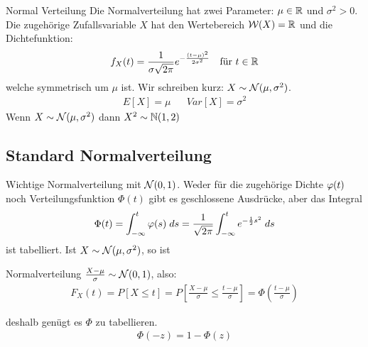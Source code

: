 \begin{definition}{Normal Verteilung}
  Die Normalverteilung hat zwei Parameter: $\mu \in \mathbb{R}$ und $\sigma^2 > 0$. Die
zugehörige Zufallsvariable $X$ hat den Wertebereich $\mathcal{W} (X) = \mathbb{R}$ und die
Dichtefunktion:
\begin{align*}
  f_X (t) = \frac{1}{\sigma \sqrt{2 \pi}} e^{- \frac{{(t - \mu)}^2}{2 \sigma^2}}
   &  & \text{für } t \in \mathbb{R}
\end{align*}
welche symmetrisch um $\mu$ ist. Wir schreiben kurz: $X \sim \mathcal{N} (\mu, \sigma^2)$.
\begin{align*}
  E[X] = \mu &  & Var[X] = \sigma^{2}
\end{align*}
Wenn $ X \sim \mathcal{N} (\mu, \sigma^2)$ dann $X^2 \sim \mathbb{N}(1, 2)$
\end{definition}

\subsection{Standard Normalverteilung}
Wichtige Normalverteilung mit $\mathcal{N} (0, 1)$. Weder für die
zugehörige Dichte $\varphi (t)$ noch Verteilungsfunktion $\Phi (t)$ gibt es
geschlossene Ausdrücke, aber das Integral
\begin{align*}
  \Phi (t) = \int_{-\infty}^t \varphi (s) \; ds =
  \frac{1}{\sqrt{2\pi}} \int_{-\infty}^t e^{-\frac{1}{2} s^2} \; ds
\end{align*}
ist tabelliert. Ist $X \sim \mathcal{N} (\mu, \sigma^2)$, so ist
\begin{definition}{Normalverteilung}
  $\frac{X - \mu}{\sigma} \sim \mathcal{N} (0, 1)$, also:
\begin{align*}
  F_X (t) = P[X \leq t] = P \left[ \frac{X-\mu}{\sigma} \leq \frac{t - \mu}{\sigma} \right] = \Phi \left  ( \frac{t - \mu}{\sigma} \right)
\end{align*}
\end{definition}
deshalb genügt es $\Phi$ zu tabellieren.
\begin{align*}
  \Phi (-z) = 1 - \Phi (z)
\end{align*}
